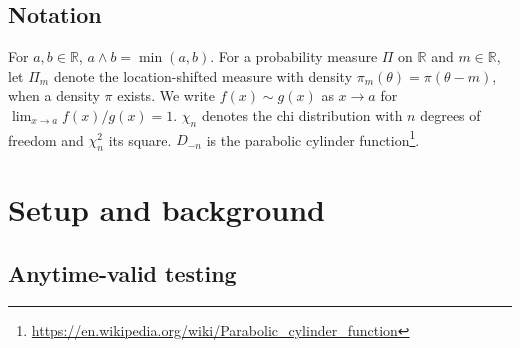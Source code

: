 \documentclass[12pt, a4paper]{report}
\newcommand{\1}{\mathbf{1}}
\begin{document}








\subsection{Notation}

For \(a,b\in\mathbb{R}\), \(a\wedge b=\min(a,b)\). For a probability measure
\(\Pi\) on \(\mathbb{R}\) and \(m\in\mathbb{R}\), let \(\Pi_m\) denote the
location-shifted measure with density \(\pi_m(\theta)=\pi(\theta-m)\),
when a density \(\pi\) exists. We write \(f(x)\sim g(x)\) as
\(x\to a\) for \(\lim_{x\to a} f(x)/g(x)=1\). %
\(\chi_n\) denotes the chi distribution with \(n\) degrees of freedom
and \(\chi_n^2\) its square. \(D_{-n}\) is the parabolic cylinder
function\footnote{\url{https://en.wikipedia.org/wiki/Parabolic_cylinder_function}}.

\section{Setup and background}\label{sec:setup}
\subsection{Anytime-valid testing}
\end{document}
